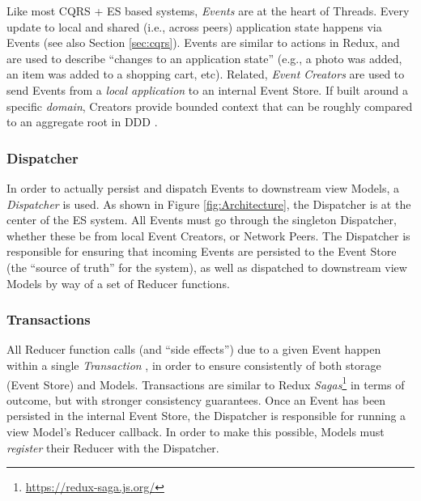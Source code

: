 \documentclass{textile}
\begin{document}
Like most CQRS + ES based systems, \emph{Events} are at the heart of Threads. Every update to local and shared (i.e., across peers) application state happens via Events (see also Section \ref{sec:cqrs}). Events are similar to actions in Redux, and are used to describe ``changes to an application state'' \cite{fowlerEventSourcing} (e.g., a photo was added, an item was added to a shopping cart, etc). Related, \emph{Event Creators} are used to send Events from a \emph{local application} to an internal Event Store. If built around a specific \emph{domain}, Creators provide bounded context that can be roughly compared to an aggregate root in DDD \cite{evansDomaindrivenDesignTackling2004a}.

\subsubsection{Dispatcher}\label{sec:dispatcher}

In order to actually persist and dispatch Events to downstream view Models, a \emph{Dispatcher} is used. As shown in Figure \ref{fig:Architecture}, the Dispatcher is at the center of the ES system. All Events must go through the singleton Dispatcher, whether these be from local Event Creators, or Network Peers. The Dispatcher is responsible for ensuring that incoming Events are persisted to the Event Store (the ``source of truth'' for the system), as well as dispatched to downstream view Models by way of a set of Reducer functions.


\subsubsection{Transactions}\label{sec:transactions}

All Reducer function calls (and ``side effects'') due to a given Event happen within a single \emph{Transaction} \cite{haerderPrinciplesTransactionorientedDatabase1983}, in order to ensure consistently of both storage (Event Store) and Models. Transactions are similar to Redux \emph{Sagas}\footnote{\url{https://redux-saga.js.org/}} in terms of outcome, but with stronger consistency guarantees. Once an Event has been persisted in the internal Event Store, the Dispatcher is responsible for running a view Model's Reducer callback. In order to make this possible, Models must \emph{register} their Reducer with the Dispatcher.
\end{document}
